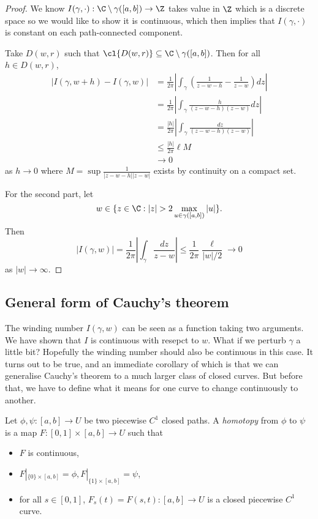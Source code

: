 \documentclass[a4paper]{article}
\begin{document}
\begin{proof}
  We know \(I(\gamma, \cdot): \C \setminus \gamma([a, b]) \to \Z\) takes value in \(\Z\) which is a discrete space so we would like to show it is continuous, which then implies that \(I(\gamma, \cdot)\) is constant on each path-connected component.

  Take \(D(w, r)\) such that \(\cl{D(w, r)} \subseteq \C \setminus \gamma([a, b])\). Then for all \(h \in D(w, r)\),
  \begin{align*}
    |I(\gamma, w + h) - I(\gamma, w)|
    &= \frac{1}{2\pi} \left| \int_\gamma\left( \frac{1}{z - w- h} - \frac{1}{z - w} \right) dz \right| \\
    &= \frac{1}{2\pi} \left| \int_\gamma \frac{h}{(z - w - h)(z - w)} dz \right| \\
    &= \frac{|h|}{2\pi} \left| \int_\gamma \frac{dz}{(z - w - h)(z - w)} \right| \\
    &\leq \frac{|h|}{2\pi} \ell M \\
    &\to 0
  \end{align*}
  as \(h \to 0\) where \(M = \sup \frac{1}{|z - w - h||z - w|}\) exists by continuity on a compact set.

  For the second part, let
  \[
    w \in \{z \in \C: |z| > 2 \max_{u \in \gamma([a, b])} |u|\}.
  \]
  Then
  \[
    |I(\gamma, w)|
    = \frac{1}{2\pi} \left| \int_\gamma \frac{dz}{z - w} \right|
    \leq \frac{1}{2\pi} \frac{\ell}{|w|/2} \to 0
  \]
  as \(|w| \to \infty\).
\end{proof}

\subsection{General form of Cauchy's theorem}

The winding number \(I(\gamma, w)\) can be seen as a function taking two arguments. We have shown that \(I\) is continuous with resepct to \(w\). What if we perturb \(\gamma\) a little bit? Hopefully the winding number should also be continuous in this case. It turns out to be true, and an immediate corollary of which is that we can generalise Cauchy's theorem to a much larger class of closed curves. But before that, we have to define what it means for one curve to change continuously to another. 

\begin{definition}[Homotopy]
  Let \(\phi, \psi: [a, b] \to U\) be two piecewise \(C^1\) closed paths. A \emph{homotopy} from \(\phi\) to \(\psi\) is a map \(F: [0, 1] \times [a, b] \to U\) such that
  \begin{itemize}
  \item \(F\) is continuous,
  \item \(F|_{\{0\} \times [a, b]} = \phi, F|_{\{1\} \times [a, b]} = \psi\),
  \item for all \(s \in [0, 1]\), \(F_s(t) = F(s, t): [a, b] \to U\) is a closed piecewise \(C^1\) curve.
  \end{itemize}
\end{definition}
\end{document}
